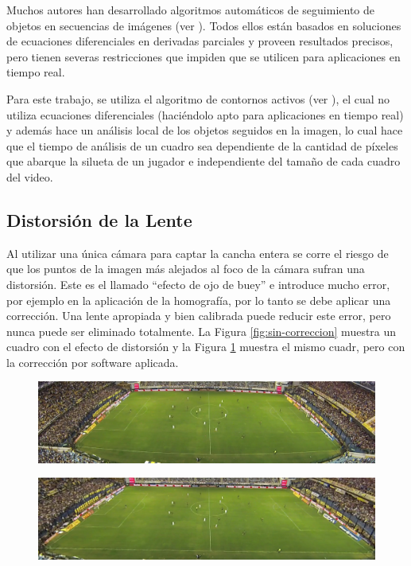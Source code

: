 Muchos autores han desarrollado algoritmos automáticos de seguimiento de
objetos en secuencias de imágenes (ver \cite{IFTrace, alp, local-learning,
MHT-2}). Todos ellos están basados en soluciones de ecuaciones diferenciales en
derivadas parciales y proveen resultados precisos, pero tienen severas
restricciones que impiden que se utilicen para aplicaciones en tiempo real.

Para este trabajo, se utiliza el algoritmo de contornos activos (ver
\cite{fast-level-set}), el cual no utiliza ecuaciones diferenciales (haciéndolo
apto para aplicaciones en tiempo real) y además hace un análisis local de los
objetos seguidos en la imagen, lo cual hace que el tiempo de análisis de un
cuadro sea dependiente de la cantidad de píxeles que abarque la silueta de un
jugador e independiente del tamaño de cada cuadro del video.

\subsection{Distorsión de la Lente}

Al utilizar una única cámara para captar la cancha entera se corre el riesgo de
que los puntos de la imagen más alejados al foco de la cámara sufran una
distorsión. Este es el llamado ``efecto de ojo de buey'' e introduce mucho
error, por ejemplo en la aplicación de la homografía, por lo tanto se debe
aplicar una corrección. Una lente apropiada y bien calibrada puede reducir este
error, pero nunca puede ser eliminado totalmente. La Figura
\ref{fig:sin-correccion} muestra un cuadro con el efecto de distorsión y la
Figura \ref{fig:con-correccion} muestra el mismo cuadr, pero con la corrección
por software aplicada.

\begin{figure}[H]
    \centering
    \includegraphics[width=.8\linewidth]{./images/sin-correccion.png}
    \label{fig:sin-correccion}
\begin{figure}[H]
\end{figure}
    \centering
    \includegraphics[width=.8\linewidth]{./images/con-correccion.png}
    \label{fig:con-correccion}
\end{figure}

